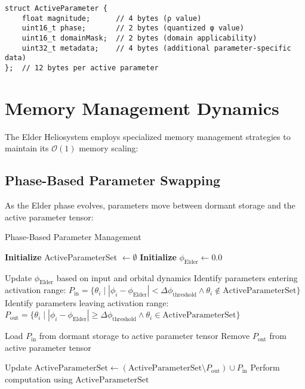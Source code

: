 \begin{tcolorbox}[colback=LightGray, colframe=DarkGray, title=Active Parameter Representation, fonttitle=\bfseries]
\begin{verbatim}
struct ActiveParameter {
    float magnitude;      // 4 bytes (ρ value)
    uint16_t phase;       // 2 bytes (quantized φ value)
    uint16_t domainMask;  // 2 bytes (domain applicability)
    uint32_t metadata;    // 4 bytes (additional parameter-specific data)
};  // 12 bytes per active parameter
\end{verbatim}
\end{tcolorbox}

\section{Memory Management Dynamics}

The Elder Heliosystem employs specialized memory management strategies to maintain its $\mathcal{O}(1)$ memory scaling:

\subsection{Phase-Based Parameter Swapping}

As the Elder phase evolves, parameters move between dormant storage and the active parameter tensor:

\begin{algorithm}
\caption{Phase-Based Parameter Management}
\begin{algorithmic}[1]
\State \textbf{Initialize} ActiveParameterSet $\gets \emptyset$
\State \textbf{Initialize} $\phi_{\text{Elder}} \gets 0.0$

    \State Update $\phi_{\text{Elder}}$ based on input and orbital dynamics
    \State Identify parameters entering activation range: $P_{\text{in}} = \{\theta_i \mid |\phi_i - \phi_{\text{Elder}}| < \Delta\phi_{\text{threshold}} \land \theta_i \notin \text{ActiveParameterSet}\}$
    \State Identify parameters leaving activation range: $P_{\text{out}} = \{\theta_i \mid |\phi_i - \phi_{\text{Elder}}| \geq \Delta\phi_{\text{threshold}} \land \theta_i \in \text{ActiveParameterSet}\}$
    
    \State Load $P_{\text{in}}$ from dormant storage to active parameter tensor
    \State Remove $P_{\text{out}}$ from active parameter tensor
    
    \State Update $\text{ActiveParameterSet} \gets (\text{ActiveParameterSet} \setminus P_{\text{out}}) \cup P_{\text{in}}$
    \State Perform computation using $\text{ActiveParameterSet}$
\EndWhile
\end{algorithmic}
\end{algorithm}

